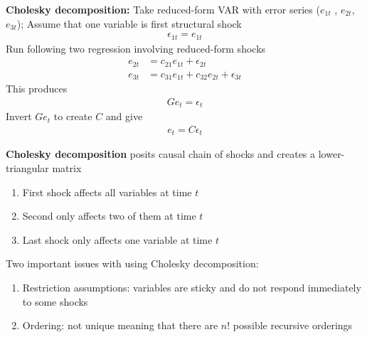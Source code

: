 \documentclass{beamer}
\begin{document}
\begin{frame}
  \textbf{Cholesky decomposition:} Take reduced-form VAR with error series ($e_{1t}$ , $e_{2t}$, $e_{3t}$); Assume that one variable is first structural shock
  \begin{align}
    \epsilon_{1t} = e_{1t} 
  \end{align}
  \medskip
  Run following two regression involving reduced-form shocks
  \begin{align}
    e_{2t} &= c_{21}e_{1t} + \epsilon_{2t}\\
    e_{3t} &= c_{31}e_{1t} + c_{32}e_{2t} + \epsilon_{3t}  
  \end{align}  
  This produces
  \begin{align}
    Ge_t= \epsilon_t
  \end{align}
  \medskip
  Invert $Ge_t$ to create $C$ and give
  \begin{align}
    e_t= C\epsilon_t
  \end{align}
\end{frame}

\begin{frame}
  \textbf{Cholesky decomposition} posits causal chain of shocks and creates a lower-triangular matrix
  \medskip
  \begin{enumerate}
  \item First shock affects all variables at time $t$
  \item Second only affects two of them at time $t$
  \item Last shock only affects one variable at time $t$
\end{enumerate} 
\end{frame}

\begin{frame}
 Two important issues with using Cholesky decomposition: \medskip
 \begin{enumerate}
   \item Restriction assumptions: variables are sticky and do not respond immediately to some shocks
   \item Ordering: not unique meaning that there are $n!$ possible recursive orderings
 \end{enumerate} 
\end{frame}
\end{document}
